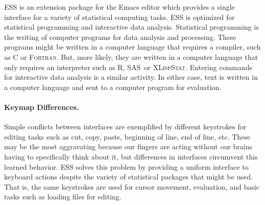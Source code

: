 \documentclass{article}
\newcommand*{\SAS}{\textsc{SAS}}
\newcommand*{\XLispStat}{\textsc{XLispStat}}
\newcommand*{\Fortran}{\textsc{Fortran}}
\begin{document}
ESS is an extension package for the Emacs editor which provides a
single interface for a variety of statistical computing tasks.  ESS is
optimized for statistical programming and interactive data analysis.
Statistical programming is the writing of computer programs for data
analysis and processing.  These programs might be written in a
computer language that requires a compiler, such as C or \Fortran.
But, more likely, they are written in a computer language that only
requires an interpreter such as R, \SAS\ or \XLispStat.
Entering commands for interactive data analysis is a similar activity.
In either case, text is written in a computer language and sent to a
computer program for evaluation.

\paragraph{Keymap Differences.} %
\label{sec:confl-keym}

Simple conflicts between interfaces are exemplified by different
keystrokes for editing tasks such as cut, copy, paste, beginning of
line, end of line, etc.  These may be the most aggravating because our
fingers are acting without our brains having to specifically think
about it, but differences in interfaces circumvent this learned
behavior.  ESS solves this problem by providing a uniform interface to
keyboard actions despite the variety of statistical packages that
might be used.  That is, the same keystrokes are used for cursor
movement, evaluation, and basic tasks such as loading files for
editing.
\end{document}
